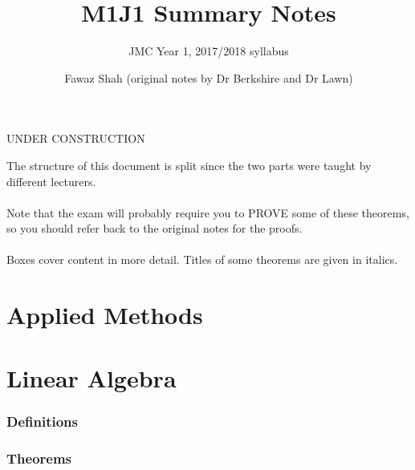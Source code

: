 \documentclass{scrartcl}
\title{M1J1 Summary Notes}
\subtitle{JMC Year 1, 2017/2018 syllabus}
\date{}
\author{Fawaz Shah (original notes by Dr Berkshire and Dr Lawn)}
\begin{document}
\large
\maketitle
\begin{center}
UNDER CONSTRUCTION
\end{center}
\noindent The structure of this document is split since the two parts were taught by different lecturers.
\\\\
Note that the exam will probably require you to PROVE some of these theorems, so you should refer back to the original notes for the proofs.
\\\\
Boxes cover content in more detail. Titles of some theorems are given in italics.
\tableofcontents
\newpage
\part{Applied Methods}

\newpage
\part{Linear Algebra}
\section{Definitions}

\section{Theorems}
\end{document}
